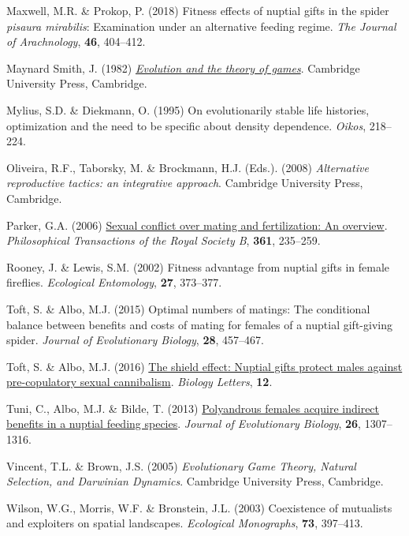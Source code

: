 \documentclass[
]{article}
\newlength{\cslhangindent}
\newlength{\cslentryspacingunit} %
\newenvironment{CSLReferences}[2] %
 {%
  \setlength{\parindent}{0pt}
  \ifodd #1
  \let\oldpar\par
  \def\par{\hangindent=\cslhangindent\oldpar}
  \fi
  \setlength{\parskip}{#2\cslentryspacingunit}
 }%
 {}
\begin{document}
\begin{CSLReferences}{0}{0}
\leavevmode{}%
Maxwell, M.R. \& Prokop, P. (2018) Fitness effects of nuptial gifts in
the spider \emph{pisaura mirabilis}: Examination under an alternative
feeding regime. \emph{The Journal of Arachnology}, \textbf{46},
404--412.

\leavevmode{}%
Maynard Smith, J. (1982)
\emph{\href{https://www.ncbi.nlm.nih.gov/pubmed/13761767}{{Evolution and
the theory of games}}}. Cambridge University Press, Cambridge.

\leavevmode{}%
Mylius, S.D. \& Diekmann, O. (1995) On evolutionarily stable life
histories, optimization and the need to be specific about density
dependence. \emph{Oikos}, 218--224.

\leavevmode{}%
Oliveira, R.F., Taborsky, M. \& Brockmann, H.J. (Eds.). (2008)
\emph{{Alternative reproductive tactics: an integrative approach}}.
Cambridge University Press, Cambridge.

\leavevmode{}%
Parker, G.A. (2006) \href{https://doi.org/10.1098/rstb.2005.1785}{Sexual
conflict over mating and fertilization: An overview}.
\emph{Philosophical Transactions of the Royal Society B}, \textbf{361},
235--259.

\leavevmode{}%
Rooney, J. \& Lewis, S.M. (2002) Fitness advantage from nuptial gifts in
female fireflies. \emph{Ecological Entomology}, \textbf{27}, 373--377.

\leavevmode{}%
Toft, S. \& Albo, M.J. (2015) Optimal numbers of matings: The
conditional balance between benefits and costs of mating for females of
a nuptial gift-giving spider. \emph{Journal of Evolutionary Biology},
\textbf{28}, 457--467.

\leavevmode{}%
Toft, S. \& Albo, M.J. (2016)
\href{https://doi.org/10.1098/rsbl.2015.1082}{{The shield effect:
Nuptial gifts protect males against pre-copulatory sexual cannibalism}}.
\emph{Biology Letters}, \textbf{12}.

\leavevmode{}%
Tuni, C., Albo, M.J. \& Bilde, T. (2013)
\href{https://doi.org/10.1111/jeb.12137}{{Polyandrous females acquire
indirect benefits in a nuptial feeding species}}. \emph{Journal of
Evolutionary Biology}, \textbf{26}, 1307--1316.

\leavevmode{}%
Vincent, T.L. \& Brown, J.S. (2005) \emph{{Evolutionary Game Theory,
Natural Selection, and Darwinian Dynamics}}. Cambridge University Press,
Cambridge.

\leavevmode{}%
Wilson, W.G., Morris, W.F. \& Bronstein, J.L. (2003) {Coexistence of
mutualists and exploiters on spatial landscapes}. \emph{Ecological
Monographs}, \textbf{73}, 397--413.

\end{CSLReferences}
\end{document}

